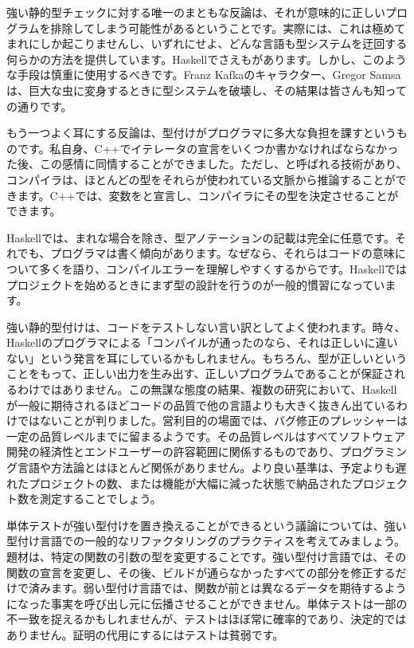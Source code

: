 強い静的型チェックに対する唯一のまともな反論は、それが意味的に正しいプログラムを排除してしまう可能性があるということです。実際には、これは極めてまれにしか起こりませんし、いずれにせよ、どんな言語も型システムを迂回する何らかの方法を提供しています。Haskellでさえもがあります。しかし、このような手段は慎重に使用するべきです。Franz Kafkaのキャラクター、Gregor Samsaは、巨大な虫に変身するときに型システムを破壊し、その結果は皆さんも知っての通りです。

もう一つよく耳にする反論は、型付けがプログラマに多大な負担を課すというものです。私自身、C++でイテレータの宣言をいくつか書かなければならなかった後、この感情に同情することができました。ただし、と呼ばれる技術があり、コンパイラは、ほとんどの型をそれらが使われている文脈から推論することができます。C++では、変数をと宣言し、コンパイラにその型を決定させることができます。

Haskellでは、まれな場合を除き、型アノテーションの記載は完全に任意です。それでも、プログラマは書く傾向があります。なぜなら、それらはコードの意味について多くを語り、コンパイルエラーを理解しやすくするからです。Haskellではプロジェクトを始めるときにまず型の設計を行うのが一般的慣習になっています。

強い静的型付けは、コードをテストしない言い訳としてよく使われます。時々、Haskellのプログラマによる「コンパイルが通ったのなら、それは正しいに違いない」という発言を耳にしているかもしれません。もちろん、型が正しいということをもって、正しい出力を生み出す、正しいプログラムであることが保証されるわけではありません。この無謀な態度の結果、複数の研究において、Haskellが一般に期待されるほどコードの品質で他の言語よりも大きく抜きん出ているわけではないことが判りました。営利目的の場面では、バグ修正のプレッシャーは一定の品質レベルまでに留まるようです。その品質レベルはすべてソフトウェア開発の経済性とエンドユーザーの許容範囲に関係するものであり、プログラミング言語や方法論とはほとんど関係がありません。より良い基準は、予定よりも遅れたプロジェクトの数、または機能が大幅に減った状態で納品されたプロジェクト数を測定することでしょう。

単体テストが強い型付けを置き換えることができるという議論については、強い型付け言語での一般的なリファクタリングのプラクティスを考えてみましょう。題材は、特定の関数の引数の型を変更することです。強い型付け言語では、その関数の宣言を変更し、その後、ビルドが通らなかったすべての部分を修正するだけで済みます。弱い型付け言語では、関数が前とは異なるデータを期待するようになった事実を呼び出し元に伝播させることができません。単体テストは一部の不一致を捉えるかもしれませんが、テストはほぼ常に確率的であり、決定的ではありません。証明の代用にするにはテストは貧弱です。

